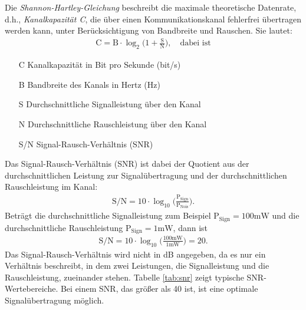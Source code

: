 \documentclass{scrartcl}
\numberwithin{equation}{section}
\begin{document}
Die \textit{Shannon-Hartley-Gleichung} beschreibt die maximale theoretische Datenrate, d.h., \textit{Kanalkapazität C}, die über einen Kommunikationskanal fehlerfrei übertragen werden kann, unter Berücksichtigung von Bandbreite und Rauschen. Sie lautet:
\begin{align*}
	\text{C} = \text{B} \cdot \log_2{\bigg(1+\frac{\text{S}}{\text{N}}\bigg)}, \quad \text{dabei ist}
\end{align*}
\begin{enumerate}
	\item[C] Kanalkapazität in Bit pro Sekunde (bit/s)
	\item[B] Bandbreite des Kanals in Hertz (Hz)
	\item[S] Durchschnittliche Signalleistung über den Kanal
	\item[N] Durchschnittliche Rauschleistung über den Kanal
	\item[S/N] Signal-Rausch-Verhältnis (SNR)
\end{enumerate}
Das Signal-Rausch-Verhältnis (SNR) ist dabei der Quotient aus der durchschnittlichen Leistung zur Signalübertragung und der durchschnittlichen Rauschleistung im Kanal:
\begin{align*}
	\text{S}/\text{N} = 10 \cdot \log_{10} \bigg(\frac{\text{P}_{\text{Sign}}}{\text{P}_{\text{Nois}}}\bigg).
\end{align*}
Beträgt die durchschnittliche Signalleistung zum Beispiel $\text{P}_{\text{Sign}} = 100\text{mW}$ und die durchschnittliche Rauschleistung $\text{P}_{\text{Sign}} = 1\text{mW}$, dann ist 
\begin{align*}
	\text{S}/\text{N} = 10 \cdot \log_{10} \bigg(\frac{100\text{mW}}{1{\text{mW}}}\bigg) = 20.
\end{align*}
Das Signal-Rausch-Verhältnis wird nicht in dB angegeben, da es nur ein Verhältnis beschreibt, in dem zwei Leistungen, die Signalleistung und die Rauschleistung, zueinander stehen. Tabelle \ref{tab:snr} zeigt typische SNR-Wertebereiche. Bei einem SNR, das größer als 40 ist, ist eine optimale Signalübertragung möglich.
\end{document}
